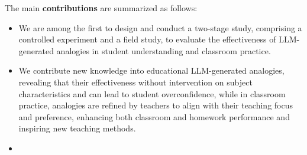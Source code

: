 The main \textbf{contributions} are summarized as follows:
\begin{itemize}
    \item We are among the first to design and conduct a two-stage study, comprising a controlled experiment and a field study, to evaluate the effectiveness of LLM-generated analogies in student understanding and classroom practice.
    \item We contribute  new knowledge into educational LLM-generated analogies, revealing that their effectiveness without intervention  on subject characteristics and can lead to student overconfidence, while in classroom practice, analogies are refined by teachers to align with their teaching focus and preference, enhancing both classroom and homework performance and inspiring new teaching methods.
    \item {}
\end{itemize}

